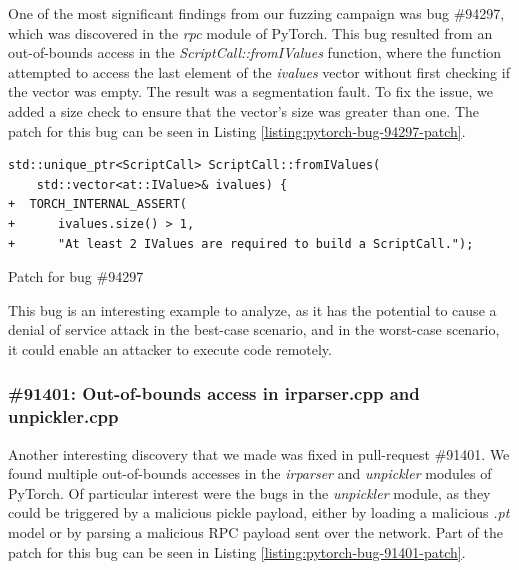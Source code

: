 One of the most significant findings from our fuzzing campaign was bug \#94297, which was discovered in the \textit{rpc} module of PyTorch. This bug resulted from an out-of-bounds access in the \textit{ScriptCall::fromIValues} function, where the function attempted to access the last element of the \textit{ivalues} vector without first checking if the vector was empty. The result was a segmentation fault. To fix the issue, we added a size check to ensure that the vector's size was greater than one. The patch for this bug can be seen in Listing \ref{listing:pytorch-bug-94297-patch}.

\begin{listing}[h!]
    \centering
    \begin{minipage}{\linewidth}
        \begin{verbatim}
std::unique_ptr<ScriptCall> ScriptCall::fromIValues(
    std::vector<at::IValue>& ivalues) {
+  TORCH_INTERNAL_ASSERT(
+      ivalues.size() > 1,
+      "At least 2 IValues are required to build a ScriptCall.");
    \end{verbatim}
    \end{minipage}
    \caption{Patch for bug \#94297}
    \label{listing:pytorch-bug-94297-patch}
\end{listing}

This bug is an interesting example to analyze, as it has the potential to cause a denial of service attack in the best-case scenario, and in the worst-case scenario, it could enable an attacker to execute code remotely.

\subsubsection{\#91401: Out-of-bounds access in irparser.cpp and unpickler.cpp}

Another interesting discovery that we made was fixed in pull-request \#91401. We found multiple out-of-bounds accesses in the \textit{irparser} and \textit{unpickler} modules of PyTorch. Of particular interest were the bugs in the \textit{unpickler} module, as they could be triggered by a malicious pickle payload, either by loading a malicious \textit{.pt} model or by parsing a malicious RPC payload sent over the network. Part of the patch for this bug can be seen in Listing \ref{listing:pytorch-bug-91401-patch}.

